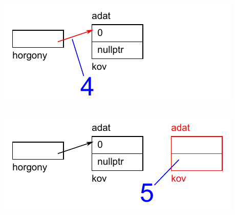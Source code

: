 \begin{frame}
  \begin{columns}[c]
      \begin{exampleblock}{}
        \vspace{-.2cm}
        \small
        
        \vspace{-.2cm}
      \end{exampleblock}
      \includegraphics[width=\textwidth]{verem/verem05.pdf}
  \end{columns}
\end{frame}

\begin{frame}
  \begin{columns}[c]
      \begin{exampleblock}{}
        \vspace{-.2cm}
        \small
        
        \vspace{-.2cm}
      \end{exampleblock}
      \includegraphics[width=\textwidth]{verem/verem06.pdf}
  \end{columns}
\end{frame}

